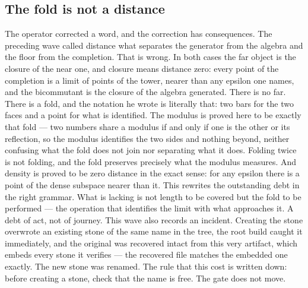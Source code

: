 \documentclass[11pt]{article}
\theoremstyle{definition}\newtheorem{deriv}{Derivation}
\begin{document}
\subsection*{The fold is not a distance}The operator corrected a word, and the correction has consequences. The preceding wave called distance what separates the generator from the algebra and the floor from the completion. That is wrong. In both cases the far object is the closure of the near one, and closure means distance zero: every point of the completion is a limit of points of the tower, nearer than any epsilon one names, and the bicommutant is the closure of the algebra generated. There is no far. There is a fold, and the notation he wrote is literally that: two bars for the two faces and a point for what is identified. The modulus is proved here to be exactly that fold --- two numbers share a modulus if and only if one is the other or its reflection, so the modulus identifies the two sides and nothing beyond, neither confusing what the fold does not join nor separating what it does. Folding twice is not folding, and the fold preserves precisely what the modulus measures. And density is proved to be zero distance in the exact sense: for any epsilon there is a point of the dense subspace nearer than it. This rewrites the outstanding debt in the right grammar. What is lacking is not length to be covered but the fold to be performed --- the operation that identifies the limit with what approaches it. A debt of act, not of journey. This wave also records an incident. Creating the stone overwrote an existing stone of the same name in the tree, the root build caught it immediately, and the original was recovered intact from this very artifact, which embeds every stone it verifies --- the recovered file matches the embedded one exactly. The new stone was renamed. The rule that this cost is written down: before creating a stone, check that the name is free. The gate does not move.
\end{document}
